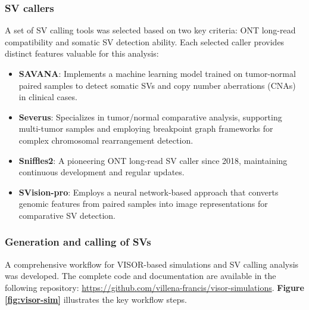 \subsubsection{SV callers}

A set of SV calling tools was selected based on two key criteria: ONT 
long-read compatibility and somatic SV detection ability. Each selected caller 
provides distinct features valuable for this analysis:

\begin{itemize}[label=\tiny\raise.5ex\hbox{•}, leftmargin=\parindent]

    \item \textbf{SAVANA}: Implements a machine learning model trained on 
    tumor-normal paired samples to detect somatic SVs and copy number 
    aberrations (CNAs) in clinical cases.

    \item \textbf{Severus}: Specializes in tumor/normal comparative analysis, 
    supporting multi-tumor samples and employing breakpoint graph frameworks 
    for complex chromosomal rearrangement detection.

    \item \textbf{Sniffles2}: A pioneering ONT long-read SV caller since 2018, 
    maintaining continuous development and regular updates.

    \item \textbf{SVision-pro}: Employs a neural network-based approach that 
    converts genomic features from paired samples into image representations 
    for comparative SV detection.
    
\end{itemize}

\subsubsection{Generation and calling of SVs}

A comprehensive workflow for VISOR-based simulations and SV calling analysis was 
developed. The complete code and documentation are available in the following
repository: \url{https://github.com/villena-francis/visor-simulations}. 
\textbf{Figure \ref{fig:visor-sim}} illustrates the key workflow steps.

\newpage

